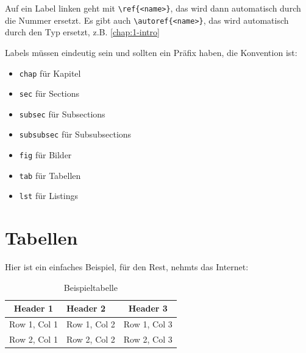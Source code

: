 Auf ein Label linken geht mit \verb|\ref{<name>}|, das wird dann automatisch durch die Nummer ersetzt. Es gibt auch \verb|\autoref{<name>}|, das wird automatisch durch den Typ ersetzt, z.B. \autoref{chap:1-intro}

Labels müssen eindeutig sein und sollten ein Präfix haben, die Konvention ist:
\begin{itemize}
    \item \verb|chap| für Kapitel
    \item \verb|sec| für Sections
    \item \verb|subsec| für Subsections
    \item \verb|subsubsec| für Subsubsections
    \item \verb|fig| für Bilder
    \item \verb|tab| für Tabellen
    \item \verb|lst| für Listings
\end{itemize}

\section{Tabellen}

Hier ist ein einfaches Beispiel, für den Rest, nehmts das Internet:

\begin{table}[H]
    \centering
    \begin{tabularx}{0.7\textwidth}{|c|X|c|} %
        \hline %
        Header 1 & Header 2 & Header 3 \\
        \hline %
        Row 1, Col 1 & Row 1, Col 2 & Row 1, Col 3 \\
        \hline %
        Row 2, Col 1 & Row 2, Col 2 & Row 2, Col 3 \\
        \hline %
    \end{tabularx}
    \caption{Beispieltabelle}\label{tab:example}
\end{table}
